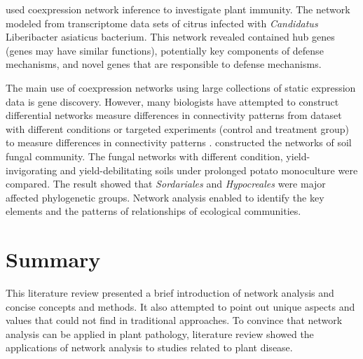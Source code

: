  used coexpression network inference to investigate plant immunity. The network modeled from transcriptome data sets of citrus infected with \textit{Candidatus} Liberibacter asiaticus bacterium. This network revealed contained hub genes (genes may have similar functions), potentially key components of defense mechanisms, and novel genes that are responsible to defense mechanisms. 

The main use of coexpression networks using large collections of static expression data is gene discovery. However, many biologists have attempted to construct differential networks measure differences in connectivity patterns from dataset with different conditions or targeted experiments (control and treatment group) to  measure differences in connectivity patterns .  constructed the networks of soil fungal community. The fungal networks with different condition, yield-invigorating and yield-debilitating soils under prolonged potato monoculture were compared. The result showed that \textit{Sordariales} and \textit{Hypocreales} were major affected phylogenetic groups. Network analysis enabled to identify the key elements and the patterns of relationships of ecological communities.

\section*{Summary}
This literature review presented a brief introduction of network analysis and concise concepts and methods. It also attempted to point out unique aspects and values that could not find in traditional approaches. To convince that network analysis can be applied in plant pathology, literature review showed the applications of network analysis to studies related to plant disease. 


